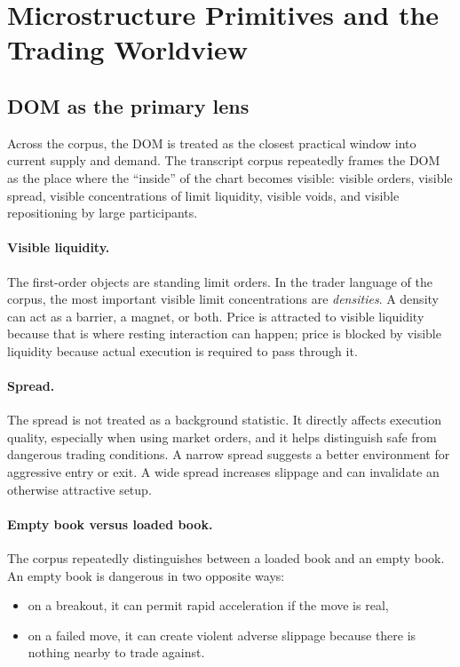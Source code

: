 \section{Microstructure Primitives and the Trading Worldview}

\subsection{DOM as the primary lens}

Across the corpus, the DOM is treated as the closest practical window into current supply and demand. The transcript corpus repeatedly frames the DOM as the place where the ``inside'' of the chart becomes visible: visible orders, visible spread, visible concentrations of limit liquidity, visible voids, and visible repositioning by large participants.

\paragraph{Visible liquidity.} The first-order objects are standing limit orders. In the trader language of the corpus, the most important visible limit concentrations are \emph{densities}. A density can act as a barrier, a magnet, or both. Price is attracted to visible liquidity because that is where resting interaction can happen; price is blocked by visible liquidity because actual execution is required to pass through it.

\paragraph{Spread.} The spread is not treated as a background statistic. It directly affects execution quality, especially when using market orders, and it helps distinguish safe from dangerous trading conditions. A narrow spread suggests a better environment for aggressive entry or exit. A wide spread increases slippage and can invalidate an otherwise attractive setup.

\paragraph{Empty book versus loaded book.} The corpus repeatedly distinguishes between a loaded book and an empty book. An empty book is dangerous in two opposite ways:

\begin{itemize}
\item on a breakout, it can permit rapid acceleration if the move is real,
\item on a failed move, it can create violent adverse slippage because there is nothing nearby to trade against.
\end{itemize}


